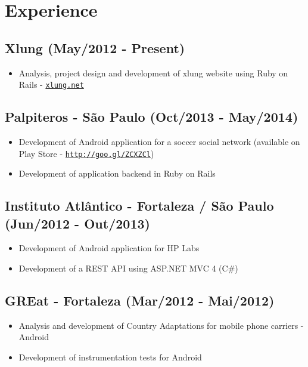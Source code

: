 \documentclass[letterpaper]{article}
\begin{document}
\section*{Experience}
{\addtolength{\leftskip}{3.5mm}

\subsection*{Xlung (May/2012 - Present)}
\begin{itemize}
\item Analysis, project design and development of xlung website using Ruby on Rails - \href{http://xlung.net}{\tt xlung.net}
\end{itemize}

\subsection*{Palpiteros - São Paulo (Oct/2013 - May/2014)}
\begin{itemize}
\item Development of Android application for a soccer social network (available on Play Store - \href{http://goo.gl/ZCXZCl}{\tt http://goo.gl/ZCXZCl})
\item Development of application backend in Ruby on Rails
\end{itemize}

\subsection*{Instituto Atlântico - Fortaleza / São Paulo (Jun/2012 - Out/2013)}
\begin{itemize}
\item Development of Android application for HP Labs
\item Development of a REST API using ASP.NET MVC 4 (C\#)
\end{itemize}

\subsection*{GREat - Fortaleza (Mar/2012 - Mai/2012)}
\begin{itemize}
\item Analysis and development of Country Adaptations for mobile phone carriers - Android
\item Development of instrumentation tests for Android
\end{itemize}

}
\end{document}
